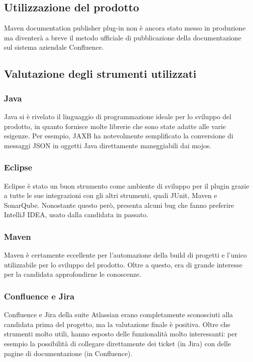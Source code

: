 \subsection{Utilizzazione del prodotto} %
Maven documentation publisher plug-in non è ancora stato messo in produzione ma diventerà a breve il metodo ufficiale di pubblicazione della documentazione sul sistema aziendale Confluence.


\subsection{Valutazione degli strumenti utilizzati}

    \subsubsection{Java}
    Java si è rivelato il linguaggio di programmazione ideale per lo sviluppo del prodotto, in quanto fornisce molte librerie che sono state adatte alle varie esigenze.
    Per esempio, JAXB ha notevolmente semplificato la conversione di messaggi JSON in oggetti Java direttamente maneggiabili dai mojos.

    \subsubsection{Eclipse}
    Eclipse è stato un buon strumento come ambiente di sviluppo per il plugin grazie a tutte le sue integrazioni con gli altri strumenti, quali JUnit, Maven e SonarQube.
    Nonostante questo però, presenta alcuni bug che fanno preferire IntelliJ IDEA, usato dalla candidata in passato.

    \subsubsection{Maven}
    Maven è certamente eccellente per l'automazione della build di progetti e l'unico utilizzabile per lo sviluppo del prodotto.
    Oltre a questo, era di grande interesse per la candidata approfondirne le conoscenze.

    \subsubsection{Confluence e Jira}
    Confluence e Jira della suite Atlassian erano completamente sconosciuti alla candidata prima del progetto, ma la valutazione finale è positiva.
    Oltre che strumenti molto utili, hanno esposto delle funzionalità molto interessanti: per esempio la possibilità di collegare direttamente dei ticket (in Jira) con delle pagine di documentazione (in Confluence).

